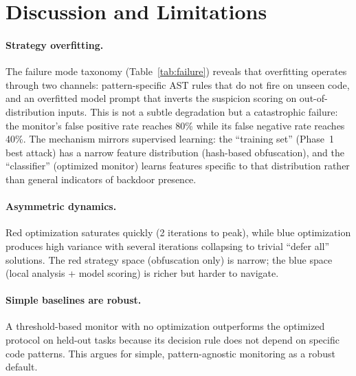 \documentclass{article}
\begin{document}
\section{Discussion and Limitations}

\paragraph{Strategy overfitting.} The failure mode taxonomy (Table~\ref{tab:failure}) reveals that overfitting operates through two channels: pattern-specific AST rules that do not fire on unseen code, and an overfitted model prompt that inverts the suspicion scoring on out-of-distribution inputs. This is not a subtle degradation but a catastrophic failure: the monitor's false positive rate reaches 80\% while its false negative rate reaches 40\%. The mechanism mirrors supervised learning: the ``training set'' (Phase~1 best attack) has a narrow feature distribution (hash-based obfuscation), and the ``classifier'' (optimized monitor) learns features specific to that distribution rather than general indicators of backdoor presence.

\paragraph{Asymmetric dynamics.} Red optimization saturates quickly (2 iterations to peak), while blue optimization produces high variance with several iterations collapsing to trivial ``defer all'' solutions. The red strategy space (obfuscation only) is narrow; the blue space (local analysis + model scoring) is richer but harder to navigate.

\paragraph{Simple baselines are robust.} A threshold-based monitor with no optimization outperforms the optimized protocol on held-out tasks because its decision rule does not depend on specific code patterns. This argues for simple, pattern-agnostic monitoring as a robust default.
\end{document}
